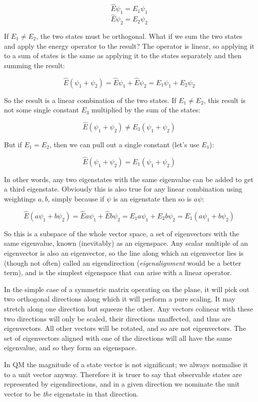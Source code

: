 $$\hat{E}\psi_1 = E_1\psi_1$$
$$\hat{E}\psi_2 = E_2\psi_2$$

If $E_1 \ne E_2$, the two states must be orthogonal. What if we sum the two states and apply the energy operator to the result? The operator is linear, so applying it to a sum of states is the same as applying it to the states separately and then summing the result:

$$\hat{E}(\psi_1 + \psi_2) = \hat{E}\psi_1 + \hat{E}\psi_2 = E_1\psi_1 + E_2\psi_2$$

So the result is a linear combination of the two states. If $E_1 \ne E_2$, this result is not   some single constant $E_3$ multiplied by the sum of the states:

$$\hat{E}(\psi_1 + \psi_2) \ne E_3 (\psi_1 + \psi_2)$$

But if $E_1 = E_2$, then we can pull out a single constant (let's use $E_1$):

$$\hat{E}(\psi_1 + \psi_2) = E_1 (\psi_1 + \psi_2)$$

In other words, any two eigenstates with the same eigenvalue can be added to get a third eigenstate. Obviously this is also true for any linear combination using weightings $a, b$, simply because if $\psi$ is an eigenstate then so is $a\psi$:

$$\hat{E}(a\psi_1 + b\psi_2) = \hat{E}a\psi_1 + \hat{E}b\psi_2 = E_1a\psi_1 + E_2b\psi_2 = E_1(a\psi_1 + b\psi_2)$$

So this is a subspace of the whole vector space, a set of eigenvectors with the same eigenvalue, known (inevitably) as an eigenspace. Any scalar multiple of an eigenvector is also an eigenvector, so the line along which an eigenvector lies is (though not often) called an eigendirection (\textit{eigenalignment} would be a better term), and is the simplest eigenspace that can arise with a linear operator.

In the simple case of a symmetric matrix operating on the plane, it will pick out two orthogonal directions along which it will perform a pure scaling. It may stretch along one direction but squeeze the other. Any vectors colinear with these two directions will only be scaled, their directions unaffected, and thus are eigenvectors. All other vectors will be rotated, and so are not eigenvectors. The set of eigenvectors aligned with one of the directions will all have the same eigenvalue, and so they form an eigenspace.

In QM the magnitude of a state vector is not significant; we always normalise it to a unit vector anyway. Therefore it is truer to say that observable states are represented by eigendirections, and in a given direction we nominate the unit vector to be \textit{the} eigenstate in that direction.

